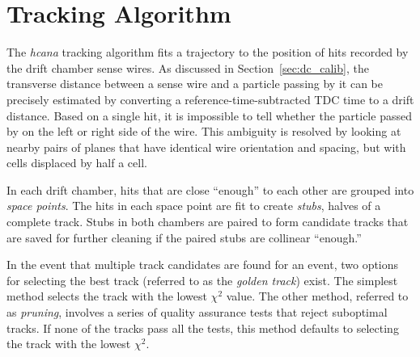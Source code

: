 \section{Tracking Algorithm}
The \textit{hcana} tracking algorithm fits a trajectory to the position of hits
recorded by the drift chamber sense wires.
As discussed in Section~\ref{sec:dc_calib}, the transverse distance between a
sense wire and a particle passing by it can be precisely estimated by
converting a reference-time-subtracted TDC time to a drift distance.
Based on a single hit, it is impossible to tell whether the particle passed by
on the left or right side of the wire.
This ambiguity is resolved by looking at nearby pairs of planes that have
identical wire orientation and spacing, but with cells displaced by half a
cell.


In each drift chamber, hits that are close ``enough'' to each other are grouped
into \textit{space points}.
The hits in each space point are fit to create \textit{stubs}, halves of a
complete track.
Stubs in both chambers are paired to form candidate tracks that are saved for
further cleaning if the paired stubs are collinear ``enough.''


In the event that multiple track candidates are found for an event, two options
for selecting the best track (referred to as the \textit{golden track}) exist.
The simplest method selects the track with the lowest $\chi^2$ value.
The other method, referred to as \textit{pruning}, involves a series of quality
assurance tests that reject suboptimal tracks.
If none of the tracks pass all the tests, this method defaults to selecting the
track with the lowest $\chi^2$.
